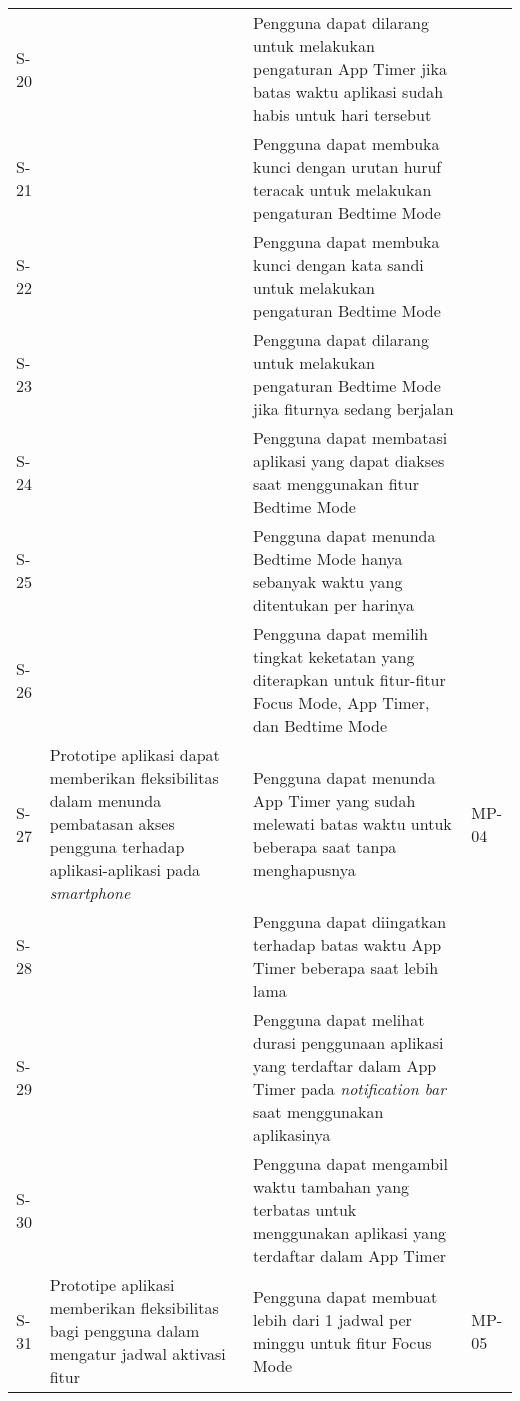 \begin{small}
\begin{longtable}[c]{|W{c}{0.07\textwidth}|>{\baselineskip=12pt}p{0.3\textwidth}|>{\baselineskip=12pt}p{0.39\textwidth}|>{\centering\arraybackslash\baselineskip=12pt}m{0.11\textwidth}|}
  S-20 &  
  & Pengguna dapat dilarang untuk melakukan pengaturan App Timer jika batas waktu aplikasi sudah habis untuk hari tersebut
  & \\  
  
  S-21 &
  & Pengguna dapat membuka kunci dengan urutan huruf teracak untuk melakukan pengaturan Bedtime Mode
  & \\  
  
  S-22 &
  & Pengguna dapat membuka kunci dengan kata sandi untuk melakukan pengaturan Bedtime Mode
  & \\  
  
  S-23 &  
  & Pengguna dapat dilarang untuk melakukan pengaturan Bedtime Mode jika fiturnya sedang berjalan
  & \\  
  
  S-24 &  
  & Pengguna dapat membatasi aplikasi yang dapat diakses saat menggunakan fitur Bedtime Mode
  & \\  
  
  S-25 & 
  & Pengguna dapat menunda Bedtime Mode hanya sebanyak waktu yang ditentukan per harinya  
  & \\  
  
  S-26 &  
  & Pengguna dapat memilih tingkat keketatan yang diterapkan untuk fitur-fitur Focus Mode, App Timer, dan Bedtime Mode
  & \\ \hline
  S-27
  & Prototipe aplikasi dapat memberikan fleksibilitas dalam menunda pembatasan akses pengguna terhadap aplikasi-aplikasi pada \textit{smartphone}
  & Pengguna dapat menunda App Timer yang sudah melewati batas waktu untuk beberapa saat tanpa menghapusnya
  & MP-04 \\  
  
  S-28 &
  & Pengguna dapat diingatkan terhadap batas waktu App Timer beberapa saat lebih lama
  & \\  
  
  S-29 &
  & Pengguna dapat melihat durasi penggunaan aplikasi yang terdaftar dalam App Timer pada \textit{notification bar} saat menggunakan aplikasinya
  & \\  
  
  S-30 &  
  & Pengguna dapat mengambil waktu tambahan yang terbatas untuk menggunakan aplikasi yang terdaftar dalam App Timer
  & \\ \hline
  S-31
  & Prototipe aplikasi memberikan fleksibilitas bagi pengguna dalam mengatur jadwal aktivasi fitur
  & Pengguna dapat membuat lebih dari 1 jadwal per minggu untuk fitur Focus Mode
  & MP-05 \\  
  

\end{longtable}
\end{small}
